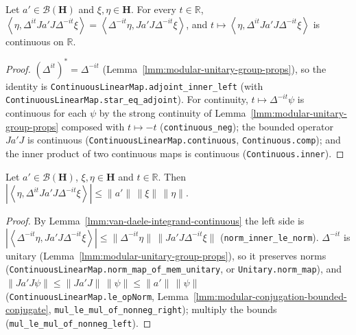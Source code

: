 \begin{lemma}
    \label{lmm:van-daele-integrand-continuous}
    \leanok
    Let $a' \in \mathcal{B}(\mathbf{H})$ and $\xi, \eta \in \mathbf{H}$. For every $t \in \mathbb{R}$, $\left< \eta, \Delta^{it}Ja'J\Delta^{-it}\xi \right> = \left< \Delta^{-it}\eta, Ja'J\Delta^{-it}\xi \right>$, and $t \mapsto \left< \eta, \Delta^{it}Ja'J\Delta^{-it}\xi \right>$ is continuous on $\mathbb{R}$.
\end{lemma}
\begin{proof}
    \leanok
    $(\Delta^{it})^* = \Delta^{-it}$ (Lemma~\ref{lmm:modular-unitary-group-props}), so the identity is \texttt{ContinuousLinearMap.adjoint\_inner\_left} (with \texttt{ContinuousLinearMap.star\_eq\_adjoint}). For continuity, $t \mapsto \Delta^{-it}\psi$ is continuous for each $\psi$ by the strong continuity of Lemma~\ref{lmm:modular-unitary-group-props} composed with $t \mapsto -t$ (\texttt{continuous\_neg}); the bounded operator $Ja'J$ is continuous (\texttt{ContinuousLinearMap.continuous}, \texttt{Continuous.comp}); and the inner product of two continuous maps is continuous (\texttt{Continuous.inner}).
\end{proof}

\begin{lemma}
    \label{lmm:van-daele-integrand-bound}
    \leanok
    Let $a' \in \mathcal{B}(\mathbf{H})$, $\xi, \eta \in \mathbf{H}$ and $t \in \mathbb{R}$. Then $\left| \left< \eta, \Delta^{it}Ja'J\Delta^{-it}\xi \right> \right| \le \|a'\|\,\|\xi\|\,\|\eta\|$.
\end{lemma}
\begin{proof}
    \leanok
    By Lemma~\ref{lmm:van-daele-integrand-continuous} the left side is $|\left< \Delta^{-it}\eta, Ja'J\Delta^{-it}\xi \right>| \le \|\Delta^{-it}\eta\|\,\|Ja'J\Delta^{-it}\xi\|$ (\texttt{norm\_inner\_le\_norm}). $\Delta^{-it}$ is unitary (Lemma~\ref{lmm:modular-unitary-group-props}), so it preserves norms (\texttt{ContinuousLinearMap.norm\_map\_of\_mem\_unitary}, or \texttt{Unitary.norm\_map}), and $\|Ja'J\psi\| \le \|Ja'J\|\,\|\psi\| \le \|a'\|\,\|\psi\|$ (\texttt{ContinuousLinearMap.le\_opNorm}, Lemma~\ref{lmm:modular-conjugation-bounded-conjugate}, \texttt{mul\_le\_mul\_of\_nonneg\_right}); multiply the bounds (\texttt{mul\_le\_mul\_of\_nonneg\_left}).
\end{proof}

